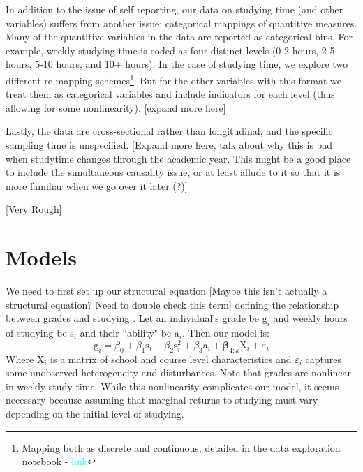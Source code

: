 \documentclass[12pt]{article}
\begin{document}
In addition to the issue of self reporting, our data on studying time (and other variables) suffers from another issue; categorical mappings of quantitive measures. Many of the quantitive variables in the data are reported as categorical bins. For example, weekly studying time is coded as four distinct levels (0-2 hours, 2-5 hours, 5-10 hours, and 10+ hours). In the case of studying time, we explore two different re-mapping schemes\footnote{Mapping both as discrete and continuous, detailed in the data exploration notebook - \href{https://github.com/nadavtadelis/Reproducible_Metrics/blob/master/data_exploration.ipynb}{\textcolor{cyan}{link}}}. But for the other variables with this format we treat them as categorical variables and include indicators for each level (thus allowing for some nonlinearity). \textcolor{BrickRed}{[expand more here]}

Lastly, the data are cross-sectional rather than longitudinal, and the specific sampling time is unspecified. \textcolor{BrickRed}{[Expand more here, talk about why this is bad when studytime changes through the academic year. This might be a good place to include the simultaneous causality issue, or at least allude to it so that it is more familiar when we go over it later (?)]}

\textcolor{BrickRed}{[Very Rough]}


\newpage
\section{Models}
We need to first set up our structural equation \textcolor{BrickRed}{[Maybe this isn't actually a structural equation? Need to double check this term]} defining the relationship between grades and studying \citep{CardKrueger}. Let an individual's grade be $\mathrm{g}_i$ and weekly hours of studying be $\mathrm{s}_i$ and their ``ability" be $\mathrm{a}_i$. Then our model is:
$$
\mathrm{g}_i = \beta_0 + \beta_1 \mathrm{s}_i + \beta_2 \mathrm{s}_i^2  + \beta_3 \mathrm{a}_i + \boldsymbol{\beta}_{4:k}\mathrm{X}_i + \varepsilon_i
$$
Where X$_i$ is a matrix of school and course level characteristics and $\varepsilon_i$ captures some unobserved heterogeneity and disturbances. Note that grades are nonlinear in weekly study time. While this nonlinearity complicates our model, it seems necessary because assuming that marginal returns to studying must vary depending on the initial level of studying.
\end{document}
